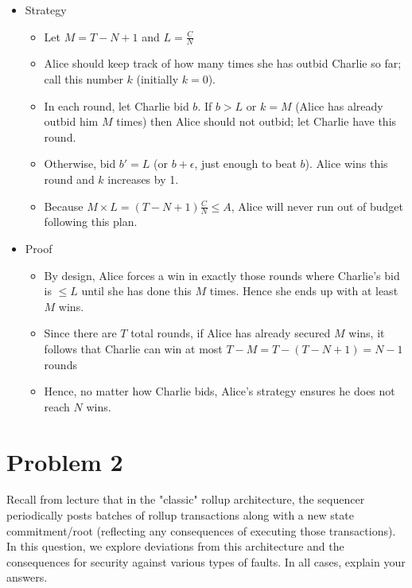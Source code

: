 \documentclass{article}
\begin{document}
\begin{enumerate}
\begin{itemize}
\item Strategy
  \begin{itemize}
  \item Let $M = T - N + 1$ and $L = \frac{C}{N}$
  \item Alice should keep track of how many times she has outbid Charlie so far; call this number $k$ (initially $k = 0$).
  \item In each round, let Charlie bid $b$. If $b > L$ or $k = M$ (Alice has already outbid him $M$ times) then Alice should not outbid; let Charlie have this round.
  \item Otherwise, bid $b' = L$ (or $b + \epsilon$, just enough to beat $b$). Alice wins this round and $k$ increases by 1.
  \item Because $M \times L = (T - N + 1) \frac{C}{N} \leq A$, Alice will never run out of budget following this plan.
  \end{itemize}
\item Proof
  \begin{itemize}
  \item By design, Alice forces a win in exactly those rounds where Charlie's bid is $\leq L$ until she has done this $M$ times. Hence she ends up with at least $M$ wins.
  \item Since there are $T$ total rounds, if Alice has already secured $M$ wins, it follows that Charlie can win at most $T - M = T - (T - N + 1) = N - 1$ rounds
  \item Hence, no matter how Charlie bids, Alice's strategy ensures he does not reach $N$ wins.
  \end{itemize}
\end{itemize}

\end{enumerate}


\section*{Problem 2}

Recall from lecture that in the "classic" rollup architecture, the sequencer periodically posts batches of rollup transactions along with a new state commitment/root (reflecting any consequences of executing those transactions). In this question, we explore deviations from this architecture and the consequences for security against various types of faults. In all cases, explain your answers.
\end{document}
